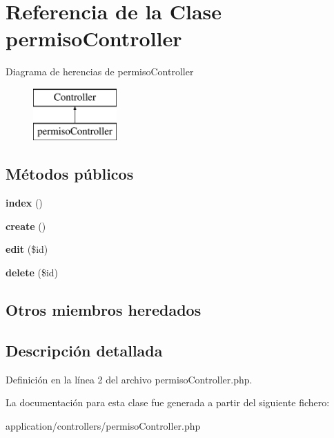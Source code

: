 \hypertarget{classpermiso_controller}{}\section{Referencia de la Clase permiso\+Controller}
\label{classpermiso_controller}
Diagrama de herencias de permiso\+Controller\begin{figure}[H]
\begin{center}
\leavevmode
\includegraphics[height=2.000000cm]{classpermiso_controller}
\end{center}
\end{figure}
\subsection*{Métodos públicos}
\begin{DoxyCompactItemize}
\item 
\mbox{\label{classpermiso_controller_a1ed1684c7cad6d2aa369c80d13e93352}} 
{\bfseries index} ()
\item 
\mbox{\label{classpermiso_controller_a3103bd0e3b6f48404f704bfc3dd4936e}} 
{\bfseries create} ()
\item 
\mbox{\label{classpermiso_controller_a0f4e66afd626231dccfa6827ad98bd6d}} 
{\bfseries edit} (\$id)
\item 
\mbox{\label{classpermiso_controller_a3b1acc3d5807d793585bf207d94a7758}} 
{\bfseries delete} (\$id)
\end{DoxyCompactItemize}
\subsection*{Otros miembros heredados}


\subsection{Descripción detallada}


Definición en la línea 2 del archivo permiso\+Controller.\+php.



La documentación para esta clase fue generada a partir del siguiente fichero\+:\begin{DoxyCompactItemize}
\item 
application/controllers/permiso\+Controller.\+php\end{DoxyCompactItemize}
